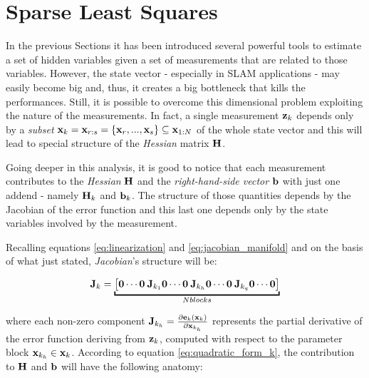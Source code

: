 \section{Sparse Least Squares}\label{sec:sparse_ls}
In the previous Sections it has been introduced several powerful tools to estimate a set of hidden variables given a set of measurements that are related to those variables. However, the state vector - especially in SLAM applications - may easily become big and, thus, it creates a big bottleneck that kills the performances. Still, it is possible to overcome this dimensional problem exploiting the nature of the measurements. In fact, a single measurement $\mathbf{z}_k$ depends only by a \textit{subset} $\mathbf{x}_k = \mathbf{x}_{r:s} = \{\mathbf{x}_r, ..., \mathbf{x}_s\} \subseteq \mathbf{x}_{1:N} $ of the whole state vector and this will lead to special structure of the \textit{Hessian} matrix $\mathbf{H}$.

Going deeper in this analysis, it is good to notice that each measurement contributes to the \textit{Hessian} $\mathbf{H}$ and the \textit{right-hand-side vector} $\mathbf{b}$ with just one addend - namely $\mathbf{H}_k$ and $\mathbf{b}_k$. The structure of those quantities depends by the Jacobian of the error function and this last one depends only by the state variables involved by the measurement. 

Recalling equations \ref{eq:linearization} and \ref{eq:jacobian_manifold} and on the basis of what just stated, \textit{Jacobian}'s structure will be:

\begin{equation}
    \jacob_k = \underbracket{\left[\zero \cdots \zero \: \jacob_{k_1} \zero \cdots \zero \: \jacob_{k_h} \zero \cdots \zero \: \jacob_{k_q} \zero \cdots \zero\right]}_{N blocks}
    \label{eq:sparse_jacobian}
\end{equation}

\noindent where each non-zero component $\mathbf{J}_{k_h} = \frac{\partial \mathbf{e}_k(\mathbf{x}_k)}{\partial \mathbf{x}_{k_h}}$ represents the partial derivative of the error function deriving from $\mathbf{z}_k$, computed with respect to the parameter block $\mathbf{x}_{k_h} \in \mathbf{x}_k$. According to equation \ref{eq:quadratic_form_k}, the contribution to $\mathbf{H}$ and $\mathbf{b}$ will have the following anatomy:

